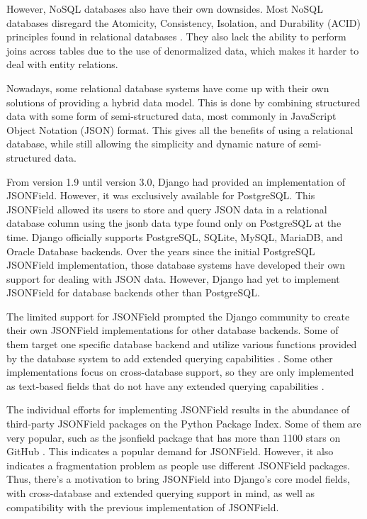 However, NoSQL databases also have their own downsides. Most NoSQL databases
disregard the Atomicity, Consistency, Isolation, and Durability (ACID)
principles found in relational databases \cite{kyle_mongodb}. They also lack
the ability to perform joins across tables due to the use of denormalized data,
which makes it harder to deal with entity relations.

Nowadays, some relational database systems have come up with their own
solutions of providing a hybrid data model. This is done by combining
structured data with some form of semi-structured data, most commonly in
JavaScript Object Notation (JSON) format. This gives all the benefits of using
a relational database, while still allowing the simplicity and dynamic nature
of semi-structured data.

From version 1.9 until version 3.0, Django had provided an implementation of
JSONField. However, it was exclusively available for PostgreSQL. This JSONField
allowed its users to store and query JSON data in a relational database column
using the jsonb data type found only on PostgreSQL at the time. Django
officially supports PostgreSQL, SQLite, MySQL, MariaDB, and Oracle Database
backends. Over the years since the initial PostgreSQL JSONField implementation,
those database systems have developed their own support for dealing with JSON
data. However, Django had yet to implement JSONField for database backends
other than PostgreSQL.

The limited support for JSONField prompted the Django community to create their
own JSONField implementations for other database backends. Some of them target
one specific database backend and utilize various functions provided by the
database system to add extended querying capabilities \cite{mysql_jsonfield}
\cite{oracle_jsonfield}. Some other implementations focus on cross-database
support, so they are only implemented as text-based fields that do not have any
extended querying capabilities \cite{ryan_jsonfield}.

The individual efforts for implementing JSONField results in the abundance of
third-party JSONField packages on the Python Package Index. Some of them are
very popular, such as the jsonfield package that has more than 1100 stars on
GitHub \cite{ryan_jsonfield}. This indicates a popular demand for JSONField.
However, it also indicates a fragmentation problem as people use different
JSONField packages. Thus, there's a motivation to bring JSONField into Django's
core model fields, with cross-database and extended querying support in mind,
as well as compatibility with the previous implementation of JSONField.

